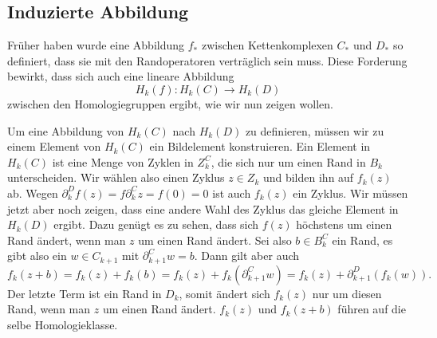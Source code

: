 \subsection{Induzierte Abbildung
\label{buch:subsection:induzierte-abbildung}}
Früher haben wurde eine Abbildung $f_*$ zwischen Kettenkomplexen $C_*$ und
$D_*$ so definiert,
dass sie mit den Randoperatoren verträglich sein muss.
Diese Forderung bewirkt, dass sich auch eine lineare Abbildung
\[
H_k(f) \colon H_k(C) \to H_k(D)
\]
zwischen den Homologiegruppen ergibt, wie wir nun zeigen wollen.

Um eine Abbildung von $H_k(C)$ nach $H_k(D)$ zu definieren, müssen wir
zu einem Element von $H_k(C)$ ein Bildelement konstruieren.
Ein Element in $H_k(C)$ ist eine Menge von Zyklen in $Z^C_k$, die sich
nur um einen Rand in $B_k$ unterscheiden.
Wir wählen also einen Zyklus $z\in Z_k$ und bilden ihn auf $f_k(z)$ ab.
Wegen $\partial^D_kf(z)=f\partial^C_kz = f(0) =0 $ ist auch $f_k(z)$
ein Zyklus.
Wir müssen jetzt aber noch zeigen, dass eine andere Wahl des Zyklus
das gleiche Element in $H_k(D)$ ergibt.
Dazu genügt es zu sehen, dass sich $f(z)$ höchstens um einen Rand
ändert, wenn man $z$ um einen Rand ändert.
Sei also $b\in B^C_k$ ein Rand, es gibt also ein $w\in C_{k+1}$ mit
$\partial^C_{k+1}w=b$.
Dann gilt aber auch
\[
f_k(z+b)
=
f_k(z) + f_k(b)
=
f_k(z) + f_k(\partial^C_{k+1}w)
=
f_k(z) + \partial^D_{k+1}(f_k(w)).
\]
Der letzte Term ist ein Rand in $D_k$, somit ändert sich $f_k(z)$ nur
um diesen Rand, wenn man $z$ um einen Rand ändert.
$f_k(z)$ und $f_k(z+b)$ führen auf die selbe Homologieklasse.


